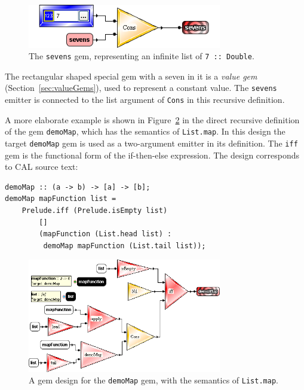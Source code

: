 \documentclass[preprint]{sigplanconf}
\begin{document}
\begin{figure}[htb]
  \centering
  \includegraphics[width=20pc]{sevens.png}
  \caption{The {\tt sevens} gem, representing an infinite list of {\tt 7 :: Double}.}
  \label{fig:sevens}
\end{figure}

The rectangular shaped special gem with a seven in it is a {\it value
gem} (Section~\ref{sec:valueGems}), used to represent a constant value. The {\tt sevens} emitter is
connected to the list argument of {\tt Cons} in this recursive
definition.

A more elaborate example is shown in Figure~\ref{fig:demoMapDesign} in
the direct recursive definition of the gem {\tt demoMap}, which has the 
semantics of {\tt List.map}. In this design the target {\tt demoMap} gem 
is used as a two-argument emitter in its definition. The {\tt iff} gem is 
the functional form of the if-then-else expression. 
The design corresponds to CAL source text:
\begin{verbatim}
demoMap :: (a -> b) -> [a] -> [b];
demoMap mapFunction list =
    Prelude.iff (Prelude.isEmpty list)
        []
        (mapFunction (List.head list) :
         demoMap mapFunction (List.tail list));
\end{verbatim}

\begin{figure}[htb]
  \centering
  \includegraphics[width=20pc]{demoMapDesign.png}
  \caption{A gem design for the {\tt demoMap} gem, with the semantics of {\tt List.map}.}
  \label{fig:demoMapDesign}
\end{figure}
\end{document}
